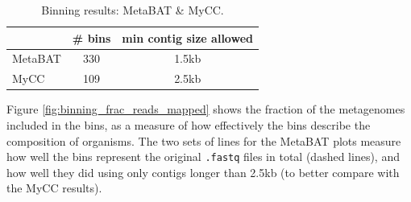\begin{table}[H]
\centering
\begin{singlespace}
\caption[Binning results: MetaBAT \& MyCC]
	{Binning results: MetaBAT \& MyCC.}
\label{table:metabat_mycc_binning_stats}
\begin{tabular}{l | cc}
            & \# bins &  min contig size allowed \\  %
\midrule
	MetaBAT & 330   & 1.5kb \\
	MyCC    & 109   & 2.5kb \\


\end{tabular}
\end{singlespace}
\end{table}

Figure \ref{fig:binning_frac_reads_mapped} shows the fraction of the metagenomes included in the bins, as a measure of how effectively the bins describe the composition of organisms.
The two sets of lines for the MetaBAT plots measure how well the bins represent the original \texttt{.fastq} files in total (dashed lines), and how well they did using only contigs longer than 2.5kb (to better compare with the MyCC results).

